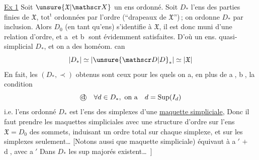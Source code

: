 \uline{Ex 1} Soit $\unsure{\mathfrak X|\mathscr X}$ un ens ordonné. Soit $D_*$ l'ens des parties finies de $\mathfrak X$, $\mathrm{tot}^{\mathrm t}$ ordonnées par l'ordre  (\textquotedblleft drapeaux de $\mathfrak X$\textquotedblright)\,; on ordonne $D_*$ par inclusion.
Alors $D_0$ (en tant qu'ens)  s'identifie à $\mathfrak X$, il est  donc muni d'une relation d'ordre, et \textcircled{a} et \textcircled{b} sont évidemment satisfaites.
D'où un ens. quasi-simplicial $D_*$, et on a des homéom. can
\[
|D_*|\simeq|\unsure{\mathscr D|D}_*|\simeq|\mathfrak X|
\]
En fait, les $(D_*,\prec)$ obtenus sont ceux pour les quels on a, en plus de \textcircled{a}, \textcircled{b},  la condition
\[
\text{\textcircled{d}}\quad\forall d\in D_*,\ \text{on a}\quad d=\mathrm{Sup}(I_d)
\]
i.e. l'ens ordonné $D_*$ est l'ens des simplexes  d'une \uline{maquette simpliciale}, 
Donc il faut prendre les maquettes simpliciales avec une structure d'ordre sur l'ens $\mathfrak X=D_0$ des sommets, induisant un ordre total sur chaque simplexe, et   sur les simplexes seulement\ldots
[Notons aussi que   maquette simpliciale) équivaut à \textcircled{a$'$} $+$  \textcircled{d}, avec
\textcircled{a$'$} Dans $D_*$ les sup  majorés existent\ldots\ ]
